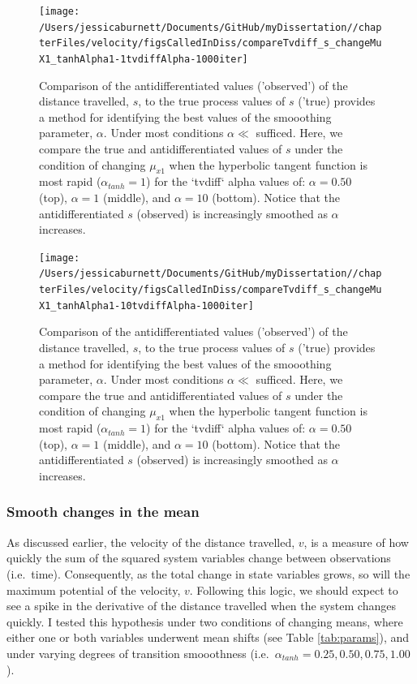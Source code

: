 \documentclass[12pt,twoside,openany]{reedthesis}
\begin{document}
\begin{figure}
\texttt{[image: /Users/jessicaburnett/Documents/GitHub/myDissertation//chapterFiles/velocity/figsCalledInDiss/compareTvdiff\_s\_changeMuX1\_tanhAlpha1-1tvdiffAlpha-1000iter]} \caption{Comparison of the antidifferentiated values ('observed') of the distance travelled, $s$, to the true process values of $s$ ('true) provides a method for identifying the best values of the smooothing parameter, $\alpha$. Under most conditions $\alpha \ll$ sufficed. Here, we compare the true and antidifferentiated values of $s$ under the condition of changing $\mu_{x1}$ when the hyperbolic tangent function is most rapid ($\alpha_{tanh}=1$) for the `tvdiff` alpha values of: $\alpha=0.50$ (top), $\alpha=1$ (middle), and $\alpha=10$ (bottom). Notice that the antidifferentiated $s$ (observed) is increasingly smoothed as $\alpha$ increases.}\label{fig:antiDiffComp}
\end{figure}
\begin{figure}
\texttt{[image: /Users/jessicaburnett/Documents/GitHub/myDissertation//chapterFiles/velocity/figsCalledInDiss/compareTvdiff\_s\_changeMuX1\_tanhAlpha1-10tvdiffAlpha-1000iter]} \caption{Comparison of the antidifferentiated values ('observed') of the distance travelled, $s$, to the true process values of $s$ ('true) provides a method for identifying the best values of the smooothing parameter, $\alpha$. Under most conditions $\alpha \ll$ sufficed. Here, we compare the true and antidifferentiated values of $s$ under the condition of changing $\mu_{x1}$ when the hyperbolic tangent function is most rapid ($\alpha_{tanh}=1$) for the `tvdiff` alpha values of: $\alpha=0.50$ (top), $\alpha=1$ (middle), and $\alpha=10$ (bottom). Notice that the antidifferentiated $s$ (observed) is increasingly smoothed as $\alpha$ increases.}\label{fig:antiDiffComp}
\end{figure}
\hypertarget{smooth-changes-in-the-mean}{%
\subsubsection{Smooth changes in the mean}\label{smooth-changes-in-the-mean}}

As discussed earlier, the velocity of the distance travelled, \(v\), is a measure of how quickly the sum of the squared system variables change between observations (i.e.~time). Consequently, as the total change in state variables grows, so will the maximum potential of the velocity, \(v\). Following this logic, we should expect to see a spike in the derivative of the distance travelled when the system changes quickly. I tested this hypothesis under two conditions of changing means, where either one or both variables underwent mean shifts (see Table \ref{tab:params}), and under varying degrees of transition smooothness (i.e.~\(\alpha_{tanh}={0.25, 0.50, 0.75, 1.00}\)).
\end{document}
